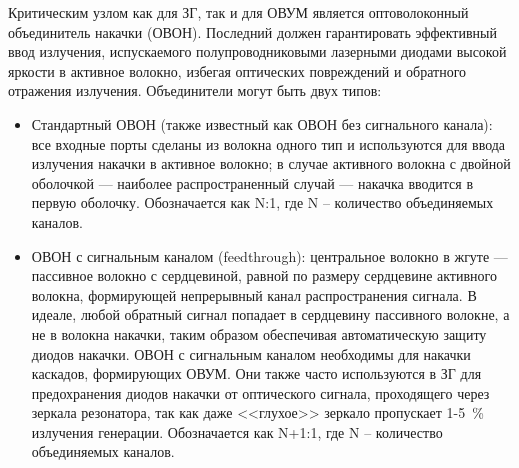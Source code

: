 Критическим узлом как для ЗГ, так и для ОВУМ является оптоволоконный объединитель накачки (ОВОН). Последний должен гарантировать эффективный ввод излучения, испускаемого полупроводниковыми лазерными диодами высокой яркости в активное волокно, избегая оптических повреждений и обратного отражения излучения. Объединители могут быть двух типов:
\begin{itemize}
  \item Стандартный ОВОН (также известный как ОВОН без сигнального канала): все входные порты сделаны из волокна одного тип и используются для ввода излучения накачки в активное волокно; в случае активного волокна с двойной оболочкой --- наиболее распространенный случай --- накачка вводится в первую оболочку. Обозначается как N:1, где N -- количество объединяемых каналов.
  \item ОВОН с сигнальным каналом (feedthrough): центральное волокно в жгуте --- пассивное волокно с сердцевиной, равной по размеру сердцевине активного волокна, формирующей непрерывный канал распространения сигнала. В идеале, любой обратный сигнал попадает в сердцевину пассивного волокне, а не в волокна накачки, таким образом обеспечивая автоматическую защиту диодов накачки. ОВОН с сигнальным каналом необходимы для накачки каскадов, формирующих ОВУМ. Они также часто используются в ЗГ для предохранения диодов накачки от оптического сигнала, проходящего через зеркала резонатора, так как даже <<глухое>> зеркало пропускает 1-5~\% излучения генерации. Обозначается как N+1:1, где N -- количество объединяемых каналов.
\end{itemize}

